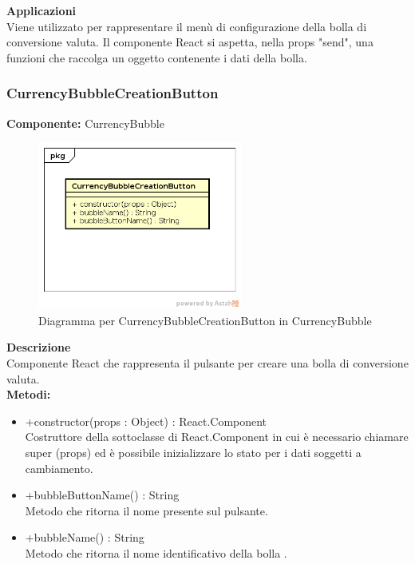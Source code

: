 \textbf{Applicazioni}\\
Viene utilizzato per rappresentare il menù di configurazione della bolla di conversione valuta. Il componente React si aspetta, nella props "send", una funzioni che raccolga un oggetto contenente i dati della bolla. 


\clearpage

\subsubsection{CurrencyBubbleCreationButton}
\textbf{Componente:}  CurrencyBubble\\
   \FloatBarrier
   \begin{figure}[ht]
   \centering
   \includegraphics[width=0.6\textwidth]{img/single-CurrencyBubbleCreationButton.png}
   \caption{{Diagramma per CurrencyBubbleCreationButton in CurrencyBubble}}
\end{figure}
\FloatBarrier
\textbf{Descrizione}\\
Componente React che rappresenta il pulsante per creare una bolla di conversione valuta.
\\
\textbf{Metodi:} 
\begin{itemize}
\item +constructor(props : Object) : React.Component 
\\
Costruttore della sottoclasse di React.Component in cui è necessario chiamare super (props) ed è possibile inizializzare lo stato per i dati soggetti a cambiamento.

\item +bubbleButtonName() : String 
\\
Metodo che ritorna il nome presente sul pulsante.

\item +bubbleName() : String 
\\
Metodo che ritorna il nome identificativo della bolla .

\end{itemize} 


